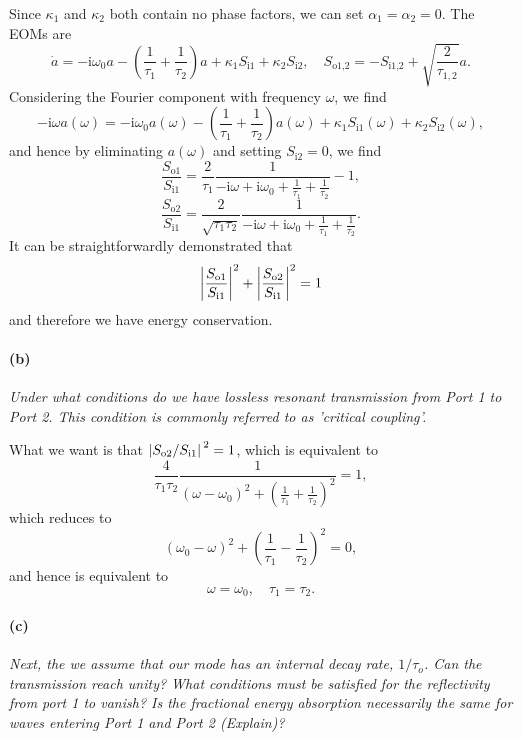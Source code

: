 \documentclass[hyperref, a4paper]{article}
\newcommand*{\ii}{\mathrm{i}}
\newcommand*{\Si}[1]{S_{\text{i#1}}}
\newcommand*{\So}[1]{S_{\text{o#1}}}
\begin{document}
Since $\kappa_1$ and $\kappa_2$ both contain no phase factors, 
we can set $\alpha_1 = \alpha_2 = 0$.
The EOMs are 
\begin{equation}
    \dot{a} = - \ii \omega_0 a - \left(\frac{1}{\tau_1} + \frac{1}{\tau_2}\right) a + 
    \kappa_1 \Si{1} + \kappa_2 \Si{2}, \quad 
    \So{1,2} = - \Si{1,2} + \sqrt{\frac{2}{\tau_{1,2}}} a.
\end{equation}
Considering the Fourier component with frequency $\omega$, we find 
\[
    - \ii \omega a(\omega) = - \ii \omega_0 a(\omega) - \left(\frac{1}{\tau_1} + \frac{1}{\tau_2}\right) a(\omega) + 
    \kappa_1 \Si{1}(\omega) + \kappa_2 \Si{2}(\omega),
\]
and hence by eliminating $a(\omega)$ and setting $\Si{2} = 0$, we find 
\begin{equation}
    \frac{\So{1}}{\Si{1}} = \frac{2}{\tau_1} \frac{1}{- \ii \omega + \ii \omega_0 + \frac{1}{\tau_1} + \frac{1}{\tau_2}} - 1,
\end{equation}
\begin{equation}
    \frac{\So{2}}{\Si{1}} = \frac{2}{\sqrt{\tau_1 \tau_2}} \frac{1}{- \ii \omega + \ii \omega_0 + \frac{1}{\tau_1} + \frac{1}{\tau_2}}.
\end{equation}
It can be straightforwardly demonstrated that 
\begin{equation}
    \abs{\frac{\So{1}}{\Si{1}}}^2 + \abs{\frac{\So{2}}{\Si{1}}}^2 = 1
\end{equation}
and therefore we have energy conservation.

\paragraph*{(b)} \textit{Under what conditions do we have lossless resonant transmission from Port 1 to Port 2. This condition is commonly referred to as 'critical coupling'.} 

What we want is that $\abs*{\So{2} / \Si{1}}^2 = 1$, which is equivalent to 
\[
    \frac{4}{\tau_1 \tau_2} \frac{1}{(\omega - \omega_0)^2 + \left( \frac{1}{\tau_1} + \frac{1}{\tau_2} \right)^2} = 1,
\]
which reduces to 
\[
    (\omega_0 - \omega)^2 + \left( \frac{1}{\tau_1} - \frac{1}{\tau_2} \right)^2 = 0,
\]
and hence is equivalent to
\begin{equation}
    \omega = \omega_0, \quad \tau_1 = \tau_2. 
\end{equation}

\paragraph*{(c)} \textit{Next, the we assume that our mode has an internal decay rate, $1 / \tau_o$. Can the transmission reach unity? What conditions must be satisfied for the reflectivity from port 1 to vanish? Is the fractional energy absorption necessarily the same for waves entering Port 1 and Port 2 (Explain)?} 
\end{document}
